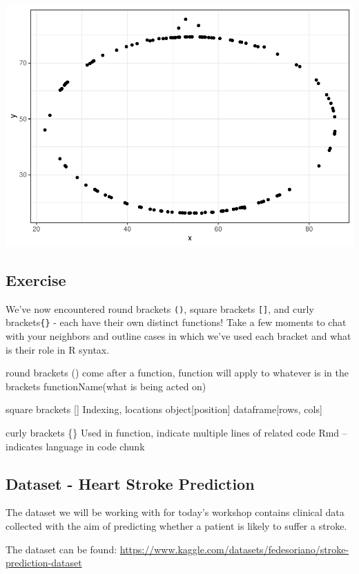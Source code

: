 \documentclass[
]{book}
\begin{document}
\includegraphics{_main_files/figure-latex/unnamed-chunk-72-2.pdf}

\subsection{Exercise}\label{exercise-3}

We've now encountered round brackets \texttt{()}, square brackets \texttt{{[}{]}}, and curly brackets\texttt{\{\}} - each have their own distinct functions! Take a few moments to chat with your neighbors and outline cases in which we've used each bracket and what is their role in R syntax.

round brackets ()
come after a function, function will apply to whatever is in the brackets
functionName(what is being acted on)

square brackets {[}{]}
Indexing, locations
object{[}position{]}
dataframe{[}rows, cols{]}

curly brackets \{\}
Used in function, indicate multiple lines of related code
Rmd -- indicates language in code chunk

\subsection{Dataset - Heart Stroke Prediction}\label{dataset---heart-stroke-prediction}

The dataset we will be working with for today's workshop contains clinical data collected with the aim of predicting whether a patient is likely to suffer a stroke.

The dataset can be found: \url{https://www.kaggle.com/datasets/fedesoriano/stroke-prediction-dataset}
\end{document}
